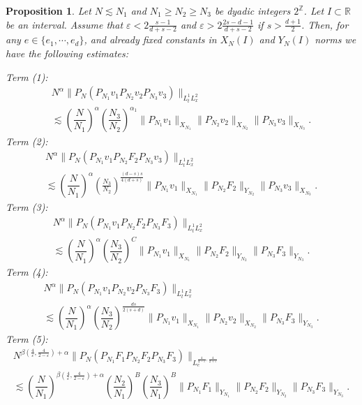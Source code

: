 \documentclass[10pt,leqno]{amsart}
\newtheorem{prop}[thm]{Proposition}
\newcommand{\R}{\mathbb{R}}
\numberwithin{equation}{section}
\newcommand{\Z}{\mathbb{Z}}
\begin{document}
\begin{prop}
\label{mainpropnonlinear}
Let $N \lesssim N_1 $ and $N_1 \geq N_2 \geq N_3$ be dyadic integers $2^{\Z}$. Let $I \subset \R$ be an interval. Assume that $\varepsilon < 2\frac{s-1}{d+s-2}$ and $\varepsilon>2 \frac{2s-d-1}{d+s-2}$ if $s>\frac{d+1}{2}$. Then, for any $e\in \{e_1, \cdots , e_d\}$, and already fixed constants in $X_N(I)$ and $Y_N(I)$ norms we have the following estimates:

\noindent
Term (1):
\begin{multline*}
N^\alpha \|P_N (P_{N_1} v_1 P_{N_2} v_2 P_{N_3}v_3)\|_{L^1_t L_x^2}\\
\lesssim \left(\dfrac{N}{N_1}\right)^{\alpha} \left(\dfrac{N_3}{N_2}\right)^{\alpha_1} \|P_{N_1}v_1\|_{X_{N_1}}\|P_{N_2}v_2\|_{X_{N_2}} \|P_{N_3}v_3\|_{X_{N_3}}. 
\end{multline*}
\noindent
Term (2):
\begin{multline*}
N^\alpha \|P_N (P_{N_1} v_1 P_{N_2} F_2 P_{N_3}v_3)\|_{L^1_t L_x^2}\\
\lesssim \left(\dfrac{N}{N_1}\right)^{\alpha} \left(\frac{N_3}{N_2} \right)^{\frac{(d-s)s}{4(d+s)}}  \|P_{N_1}v_1\|_{X_{N_1}}\|P_{N_2}F_2\|_{Y_{N_2}} \|P_{N_3}v_3\|_{X_{N_3}}. 
\end{multline*}
\noindent
Term (3):
\begin{multline*}
N^\alpha \|P_N (P_{N_1} v_1 P_{N_2} F_2 P_{N_3}F_3)\|_{L^1_t L_x^2}\\
\lesssim \left(\dfrac{N}{N_1}\right)^{\alpha} \left(\dfrac{N_3}{N_2}\right)^{C} \|P_{N_1}v_1\|_{X_{N_1}}\|P_{N_2}F_2\|_{Y_{N_2}} \|P_{N_3}F_3\|_{Y_{N_3}}. 
\end{multline*}
\noindent
Term (4):
\begin{multline*}
N^\alpha \|P_N (P_{N_1} v_1 P_{N_2} v_2 P_{N_3}F_3)\|_{L^1_t L_x^2}\\
\lesssim \left(\dfrac{N}{N_1}\right)^{\alpha} \left(\dfrac{N_3}{N_2}\right)^{\frac{ds}{2(s+d)}} \|P_{N_1}v_1\|_{X_{N_1}}\|P_{N_2}v_2\|_{X_{N_2}} \|P_{N_3}F_3\|_{Y_{N_3}}. 
\end{multline*}
\noindent
Term (5):
\begin{multline*}
N^{\beta (\frac{4}{\varepsilon},\frac{4}{2-\varepsilon}) +\alpha} \|P_N (P_{N_1} F_1 P_{N_2} F_2 P_{N_3} F_3) \|_{L_e^{\frac{4}{4-\varepsilon} , \frac{4}{2+\varepsilon}} }\\
 \lesssim \left(\dfrac{N}{N_1}\right)^{\beta  (\frac{4}{\varepsilon},\frac{4}{2-\varepsilon})+ \alpha} \left(\dfrac{N_2}{N_1}\right)^B \left(\dfrac{N_3}{N_1}\right)^{B} 
 \|P_{N_1}F_1\|_{Y_{N_1}}\|P_{N_2}F_2\|_{Y_{N_2}} \|P_{N_3}F_3\|_{Y_{N_3}}.  

\end{multline*}
\end{prop}
\end{document}
